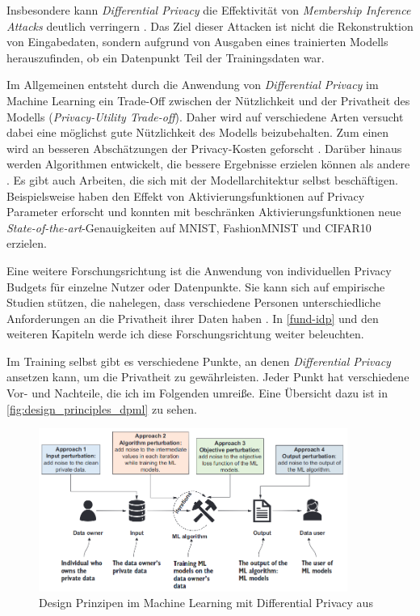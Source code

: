 Insbesondere kann \textit{Differential Privacy} die Effektivität von \textit{Membership Inference Attacks} \cite{shokri:2017} deutlich verringern \cite[p.14f]{chang:2023}. Das Ziel dieser Attacken ist nicht die Rekonstruktion von Eingabedaten, sondern aufgrund von Ausgaben eines trainierten Modells herauszufinden, ob ein Datenpunkt Teil der Trainingsdaten war.

Im Allgemeinen entsteht durch die Anwendung von \textit{Differential Privacy} im Machine Learning ein Trade-Off zwischen der Nützlichkeit und der Privatheit des Modells (\textit{Privacy-Utility Trade-off}). Daher wird auf verschiedene Arten versucht dabei eine möglichst gute Nützlichkeit des Modells beizubehalten. Zum einen wird an besseren Abschätzungen der Privacy-Kosten geforscht \cite{dwork:2010, abadi:2016, mironov:2019}. Darüber hinaus werden Algorithmen entwickelt, die bessere Ergebnisse erzielen können als andere \cite{papernot:2017}. Es gibt auch Arbeiten, die sich mit der Modellarchitektur selbst beschäftigen. Beispielsweise haben \textcite{papernot:2021} den Effekt von Aktivierungsfunktionen auf Privacy Parameter erforscht und konnten mit beschränken Aktivierungsfunktionen neue \textit{State-of-the-art}-Genauigkeiten auf MNIST, FashionMNIST und CIFAR10 erzielen.

Eine weitere Forschungsrichtung ist die Anwendung von individuellen Privacy Budgets für einzelne Nutzer oder Datenpunkte. Sie kann sich auf empirische Studien stützen, die nahelegen, dass verschiedene Personen unterschiedliche Anforderungen an die Privatheit ihrer Daten haben \cite{jensen:2005, acquisti:2005}. In \autoref{fund-idp} und den weiteren Kapiteln werde ich diese Forschungsrichtung weiter beleuchten.

Im Training selbst gibt es verschiedene Punkte, an denen \textit{Differential Privacy} ansetzen kann, um die Privatheit zu gewährleisten. Jeder Punkt hat verschiedene Vor- und Nachteile, die ich im Folgenden umreiße. Eine Übersicht dazu ist in \autoref{fig:design_principles_dpml} zu sehen.

\begin{figure}[tb]
	\centering
	\includegraphics[width=0.9\textwidth]{Bilder/design_principles_dpml.png}
	\caption{Design Prinzipen im Machine Learning mit Differential Privacy aus \textcite{chang:2023}}
	\label{fig:design_principles_dpml}
\end{figure}

